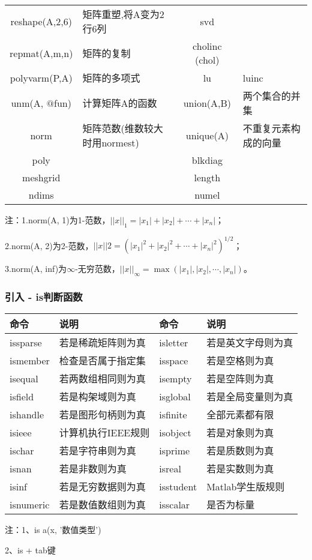 \begin{longtable}{|c|l|c|l|}
            reshape(A,2,6)& 矩阵重塑,将A变为2行6列 &svd  &{}\\
            repmat(A,m,n)&  矩阵的复制 &cholinc (chol)&{}\\
            polyvarm(P,A)&  矩阵的多项式& lu& luinc\\
            unm(A, $@$fun)& 计算矩阵A的函数  &union(A,B)&  两个集合的并集\\
            norm  &矩阵范数(维数较大时用normest)& unique(A) &不重复元素构成的向量\\
            poly  &{}&  blkdiag &{}\\
            meshgrid    &{}&  length&{}\\
            ndims   &{}&  numel &{}\\
                \bottomrule
            \end{longtable}
            \noindent 注：1.norm(A, 1)为1-范数，$||x||_1=|x_1|+|x_2|+\cdots+|x_n|$；
            \par
            2.norm(A, 2)为2-范数，$||x||2=(|x_1|^2+|x_2|^2+\cdots+|x_n|^2)^{1/2}$；
            \par
            3.norm(A, inf)为$\infty$-无穷范数，$||x||_\infty=\max(|x_1|,|x_2|,\cdots,|x_n|)$。

        \subsubsection{引入 - is判断函数}
            \begin{table}[H]
            \centering
              \begin{tabular}{llll}%
                \toprule
                 命令 &  说明&命令 &  说明\\
                \midrule
            issparse  &若是稀疏矩阵则为真  & isletter  &若是英文字母则为真 \\
            ismember& 检查是否属于指定集&isspace&  若是空格则为真\\
            isequal   &若两数组相同则为真&isempty  &若是空阵则为真\\
            isfield &若是构架域则为真&isglobal  &若是全局变量则为真\\
            ishandle&   若是图形句柄则为真&isfinite  & 全部元素都有限\\
            isieee &  计算机执行IEEE规则&isobject  &若是对象则为真\\
            ischar  &若是字符串则为真&  isprime   &若是质数则为真\\
            isnan &若是非数则为真& isreal  &若是实数则为真\\
            isinf &若是无穷数据则为真& isstudent &Matlab学生版规则\\
            isnumeric &若是数值数组则为真  &isscalar&  是否为标量\\
                \bottomrule
            \end{tabular}
            \end{table}
            \noindent 注：1、is a(x, ’数值类型’)
            \par
             2、is + tab键


